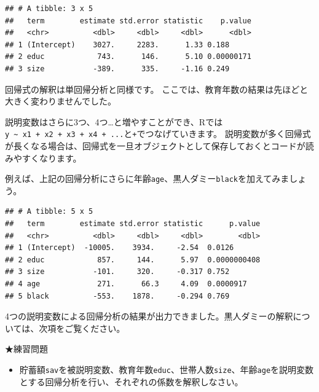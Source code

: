 \documentclass[]{book}
\newenvironment{Shaded}{\begin{snugshade}}{\end{snugshade}}
\newcommand{\KeywordTok}[1]{\textcolor[rgb]{0.13,0.29,0.53}{\textbf{#1}}}
\newcommand{\DataTypeTok}[1]{\textcolor[rgb]{0.13,0.29,0.53}{#1}}
\newcommand{\StringTok}[1]{\textcolor[rgb]{0.31,0.60,0.02}{#1}}
\newcommand{\OperatorTok}[1]{\textcolor[rgb]{0.81,0.36,0.00}{\textbf{#1}}}
\newcommand{\NormalTok}[1]{#1}
\providecommand{\tightlist}{%
  \setlength{\itemsep}{0pt}\setlength{\parskip}{0pt}}
\begin{document}
\begin{verbatim}
## # A tibble: 3 x 5
##   term        estimate std.error statistic    p.value
##   <chr>          <dbl>     <dbl>     <dbl>      <dbl>
## 1 (Intercept)    3027.     2283.      1.33 0.188     
## 2 educ            743.      146.      5.10 0.00000171
## 3 size           -389.      335.     -1.16 0.249
\end{verbatim}

回帰式の解釈は単回帰分析と同様です。
ここでは、教育年数の結果は先ほどと大きく変わりませんでした。

説明変数はさらに3つ、4つ\ldots{}と増やすことができ、Rでは\texttt{y\ \textasciitilde{}\ x1\ +\ x2\ +\ x3\ +\ x4\ +\ ...}と\texttt{+}でつなげていきます。
説明変数が多く回帰式が長くなる場合は、回帰式を一旦オブジェクトとして保存しておくとコードが読みやすくなります。

例えば、上記の回帰分析にさらに年齢\texttt{age}、黒人ダミー\texttt{black}を加えてみましょう。

\begin{Shaded}
\end{Shaded}

\begin{verbatim}
## # A tibble: 5 x 5
##   term        estimate std.error statistic      p.value
##   <chr>          <dbl>     <dbl>     <dbl>        <dbl>
## 1 (Intercept)  -10005.    3934.     -2.54  0.0126      
## 2 educ            857.     144.      5.97  0.0000000408
## 3 size           -101.     320.     -0.317 0.752       
## 4 age             271.      66.3     4.09  0.0000917   
## 5 black          -553.    1878.     -0.294 0.769
\end{verbatim}

4つの説明変数による回帰分析の結果が出力できました。黒人ダミーの解釈については、次項をご覧ください。

★練習問題

\begin{itemize}
\tightlist
\item
  貯蓄額\texttt{sav}を被説明変数、教育年数\texttt{educ}、世帯人数\texttt{size}、年齢\texttt{age}を説明変数とする回帰分析を行い、それぞれの係数を解釈しなさい。
\end{itemize}
\end{document}
